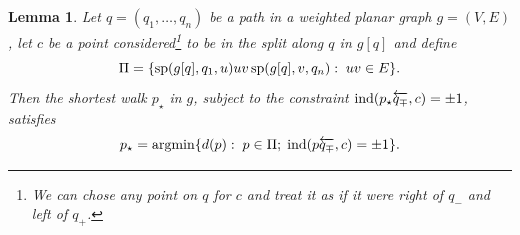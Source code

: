 \documentclass[reqno]{amsart}
\let\join\relax
\DeclareMathOperator*{\argmin}{argmin}
\DeclareMathOperator{\join}{\dot{+}}
\DeclareMathOperator{\ind}{ind}
\DeclareMathOperator{\spa}{sp}
\newtheorem{lemma}{Lemma}
\begin{document}
\begin{lemma}\label{lemma:shortestEnclosingArc}
Let $q = (q_1,\dots,q_n)$ be a path in a weighted planar graph $g = (V,E)$, let $c$ be a point considered\footnote{We can chose any point on $q$ for $c$ and treat it as if it were right of $q_-$ and left of $q_+$.} to be in the split along $q$ in $g[q]$ and define
\[
	\Pi = \{\spa(g[q], q_1, u) \join uv \join \spa(g[q], v, q_n):\; uv \in E \}.
	\]
Then the shortest walk $p_\star$ in $g$, subject to the constraint $\ind(p_\star \join \overleftarrow{q_\mp}, c) = \pm 1$, satisfies
\begin{equation}
	p_\star = \argmin\{d(p) :\; p \in \Pi;\; \ind(p \join \overleftarrow{q_\mp},c)= \pm 1 \}.
	\label{eq:shortestEnlcosingArc}
\end{equation}


\end{lemma}
\end{document}
